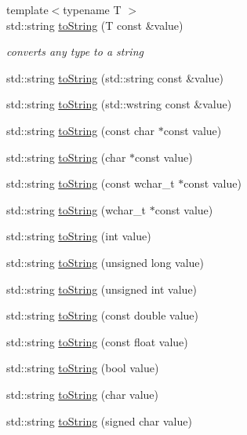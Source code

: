 \begin{DoxyCompactItemize}
\item 
{\footnotesize template$<$typename T $>$ }\\std\-::string \hyperlink{namespace_catch_a386cb19a84b12339486771ad143a95ae}{to\-String} (T const \&value)
\begin{DoxyCompactList}\small\item\em converts any type to a string \end{DoxyCompactList}\item 
std\-::string \hyperlink{namespace_catch_ad6e969257437cf007b8b5017b22e570c}{to\-String} (std\-::string const \&value)
\item 
std\-::string \hyperlink{namespace_catch_af9fc40701e3a7d0790866e7cf8c0279f}{to\-String} (std\-::wstring const \&value)
\item 
std\-::string \hyperlink{namespace_catch_ace2e2fe33b196bc8278f605dcb72e38d}{to\-String} (const char $\ast$const value)
\item 
std\-::string \hyperlink{namespace_catch_ae6c2bc95517444d8df8199bd3f61609b}{to\-String} (char $\ast$const value)
\item 
std\-::string \hyperlink{namespace_catch_afa173b4639c682c9d8c20fae0939693c}{to\-String} (const wchar\-\_\-t $\ast$const value)
\item 
std\-::string \hyperlink{namespace_catch_aa39121565abe9f30fce5d48e4e094768}{to\-String} (wchar\-\_\-t $\ast$const value)
\item 
std\-::string \hyperlink{namespace_catch_acee54d0580385e4347bc42a7d22bc893}{to\-String} (int value)
\item 
std\-::string \hyperlink{namespace_catch_aba1d78bce62f8c73cbfc2a14225356ea}{to\-String} (unsigned long value)
\item 
std\-::string \hyperlink{namespace_catch_a6fd78030f740c1c3bdc60efdfd5fc85d}{to\-String} (unsigned int value)
\item 
std\-::string \hyperlink{namespace_catch_a3eb4356d09b7ef3286f6c1c1efe8cabf}{to\-String} (const double value)
\item 
std\-::string \hyperlink{namespace_catch_a80b6411e2cba89e58aa8feb960d045d5}{to\-String} (const float value)
\item 
std\-::string \hyperlink{namespace_catch_a5d3bdb2ec0e6f415e2a1a0e4914d7d3a}{to\-String} (bool value)
\item 
std\-::string \hyperlink{namespace_catch_a25a0a78cbb62ea08b5d49e443051c387}{to\-String} (char value)
\item 
std\-::string \hyperlink{namespace_catch_a0a5d9d0965d0d2a0663773732283713e}{to\-String} (signed char value)

\end{DoxyCompactItemize}
